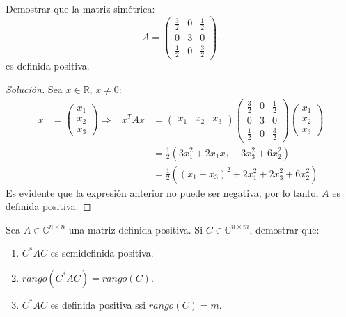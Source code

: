\documentclass[12pt]{book}
\newcommand{\C}{\mathbb{C}}
\newcommand{\R}{\mathbb{R}}
\newenvironment{solucion}
  {\renewcommand\qedsymbol{$\square$}\begin{proof}[Solución]}
  {\end{proof}}
\begin{document}
\eje Demostrar que la matriz simétrica:
    \[
        A=\begin{pmatrix}
            \frac{3}{2} & 0 & \frac{1}{2}\\
            0 & 3 & 0\\
            \frac{1}{2} & 0 & \frac{3}{2}
        \end{pmatrix}.
    \]
es definida positiva.
\begin{solucion}
Sea $x\in\R$, $x\neq0$:
\begin{align*}
    x&=\begin{pmatrix}
    x_1\\
    x_2\\
    x_3
    \end{pmatrix}\Rightarrow &  x^TAx&=\begin{pmatrix}
    x_1 & x_2 & x_3
    \end{pmatrix}\begin{pmatrix}
    \frac{3}{2} & 0 & \frac{1}{2}\\
0 & 3 & 0\\
\frac{1}{2} & 0 & \frac{3}{2}
\end{pmatrix}\begin{pmatrix}
    x_1\\
    x_2\\
    x_3
    \end{pmatrix}\\
    & & &=\frac{1}{2}(3x_1^2+2x_1x_3+3x_3^2+6x_2^2)\\
    & & &=\frac{1}{2}((x_1+x_3)^2+2x_1^2+2x_3^2+6x_2^2)
\end{align*}
Es evidente que la expresión anterior no puede ser negativa, por lo tanto, $A$ es definida positiva.
\end{solucion}

\eje Sea $A\in\C^{n\times n}$ una matriz definida positiva. Si $C\in\C^{n\times m}$, demostrar que:
\renewcommand{\labelenumi}{(\alph{enumi})}
\begin{enumerate}
    \item $C^*AC$ es semidefinida positiva.
    \item $rango(C^*AC)= rango(C)$.
    \item $C^*AC$ es definida positiva ssi $rango(C)=m$.
\end{enumerate}
\end{document}

